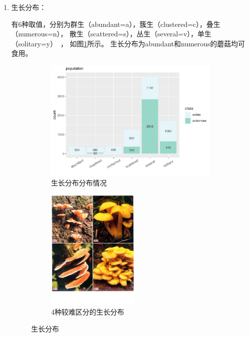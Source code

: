 \documentclass[lang=cn,11pt,a4paper,cite=super]{elegantpaper}
\begin{document}
\begin{enumerate}
   \item 生长分布：\par 有6种取值，分别为群生（abundant=a），簇生（clustered=c），叠生（numerous=n），
   散生（scattered=s），丛生（several=v），单生（solitary=y）~\cite{2018tujian}，
   如图\ref{fig:szfb}所示。
   生长分布为abundant和numerous的蘑菇均可食用。
   \begin{figure}[bth]
      \begin{subfigure}[t]{0.64\textwidth}
        \centering
        \includegraphics[width=\linewidth]{img/population-1.pdf}   
        \caption{生长分布分布情况}
        \label{fig:szfb}
      \end{subfigure}
      \begin{subfigure}[t]{0.35\textwidth}
        \centering
        \includegraphics[width=\linewidth,height=2.3in]{img/szfb.PNG}  
        \caption{4种较难区分的生长分布}
      \end{subfigure}
      \caption{生长分布}
   \end{figure}



\end{enumerate}
\end{document}
